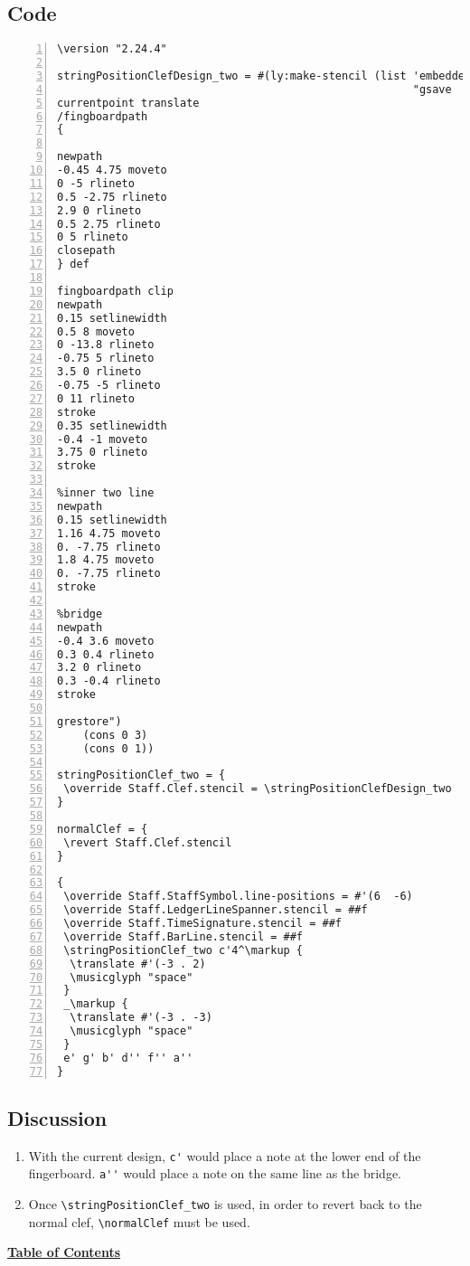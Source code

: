 \subsection{Code}
\begin{Verbatim}[numbers=left,xleftmargin=5mm]
\version "2.24.4"

stringPositionClefDesign_two = #(ly:make-stencil (list 'embedded-ps
                                                       "gsave
currentpoint translate
/fingboardpath
{

newpath 
-0.45 4.75 moveto
0 -5 rlineto
0.5 -2.75 rlineto
2.9 0 rlineto
0.5 2.75 rlineto
0 5 rlineto
closepath
} def

fingboardpath clip
newpath 
0.15 setlinewidth
0.5 8 moveto
0 -13.8 rlineto
-0.75 5 rlineto
3.5 0 rlineto
-0.75 -5 rlineto
0 11 rlineto
stroke
0.35 setlinewidth
-0.4 -1 moveto
3.75 0 rlineto
stroke

%inner two line
newpath
0.15 setlinewidth
1.16 4.75 moveto
0. -7.75 rlineto
1.8 4.75 moveto
0. -7.75 rlineto
stroke

%bridge
newpath
-0.4 3.6 moveto
0.3 0.4 rlineto
3.2 0 rlineto
0.3 -0.4 rlineto
stroke

grestore")
	(cons 0 3)
	(cons 0 1))

stringPositionClef_two = {
 \override Staff.Clef.stencil = \stringPositionClefDesign_two
}

normalClef = {
 \revert Staff.Clef.stencil
}

{
 \override Staff.StaffSymbol.line-positions = #'(6  -6)
 \override Staff.LedgerLineSpanner.stencil = ##f
 \override Staff.TimeSignature.stencil = ##f
 \override Staff.BarLine.stencil = ##f
 \stringPositionClef_two c'4^\markup {
  \translate #'(-3 . 2)
  \musicglyph "space"
 }
 _\markup {
  \translate #'(-3 . -3)
  \musicglyph "space"
 }
 e' g' b' d'' f'' a''
}
\end{Verbatim}

\subsection{Discussion}
\begin{enumerate}
\item With the current design, \verb|c'| would place a note at the lower end of the fingerboard. \verb|a''| would place a note on the same line as the bridge. 

\item Once \verb|\stringPositionClef_two| is used, in order to revert back to the normal clef, \verb|\normalClef| must be used.
\end{enumerate}

\hyperref[sec:toc]{\textbf{Table of Contents}}

\vfill \break


